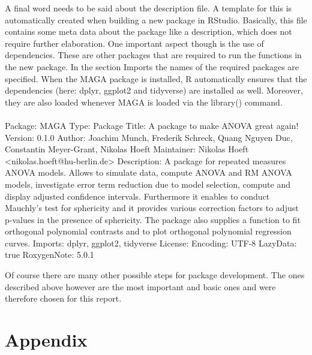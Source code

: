 \documentclass[11pt]{article}
\begin{document}
		A final word needs to be said about the description file. A template for this is automatically created when building a new package in RStudio. Basically, this file contains some meta data about the package like a description, which does not require further elaboration. One important aspect though is the use of dependencies. These are other packages that are required to run the functions in the new package. In the section Imports the names of the required packages are specified. When the MAGA package is installed, R automatically ensures that the dependencies (here: dplyr, ggplot2 and tidyverse) are installed as well. Moreover, they are also loaded whenever MAGA is loaded via the library() command.\\
		\\
		Package: MAGA
		Type: Package
		Title: A package to make ANOVA great again!
		Version: 0.1.0
		Author: Joachim Munch, Frederik Schreck, Quang Nguyen Duc, Constantin Meyer-Grant, Nikolas Hoeft
		Maintainer: Nikolas Hoeft <nikolas.hoeft@hu-berlin.de>
		Description: A package for repeated measures ANOVA models. 
		Allows to simulate data, compute ANOVA and RM ANOVA 
		models, investigate error term reduction due to model selection, 
		compute and display adjusted confidence intervals. 
		Furthermore it enables to conduct Mauchly's test for 
		sphericity and it provides various correction factors to 
		adjust p-values in the presence of sphericity. The package 
		also supplies a function to fit orthogonal polynomial 
		contrasts and to plot orthogonal polynomial regression curves.
		Imports:
		dplyr,
		ggplot2,
		tidyverse
		License: 
		Encoding: UTF-8
		LazyData: true
		RoxygenNote: 5.0.1
		
		
		Of course there are many other possible steps for package development. The ones described above however are the most important and basic ones and were therefore chosen for this report.
		
		
		
		
		
	

 
	\section*{Appendix}
	\newpage
 
 

	
\end{document}
